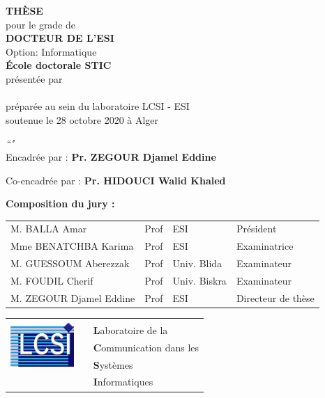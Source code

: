 \begin{center}
	
	{\Large \bfseries TH\`ESE}\\
	pour le grade de\\
	{\Large \bfseries DOCTEUR DE L'ESI}\\
	Option: Informatique\\
	{\bfseries École doctorale STIC}\\
	présentée par\\
	{\LARGE \bfseries \@author}\\[0.5cm]
	préparée au sein du laboratoire LCSI - ESI \\
	soutenue le 28 octobre 2020 à Alger\\[1cm]
	
	
	{\Huge \bfseries \@title}

	{\LARGE \slshape ``\@subtitle"}\\[1cm]
	
	Encadrée par : \textbf{Pr. ZEGOUR Djamel Eddine}
	
	Co-encadrée par : \textbf{Pr. HIDOUCI Walid Khaled}
\end{center}
\makeatother %


\vfill

\noindent
\textbf{Composition du jury :}

\noindent
\begin{tabular}{p{}p{}p{}p{}}
	M. BALLA Amar & Prof & ESI & Président \\
	Mme BENATCHBA Karima & Prof & ESI & Examinatrice \\
	M. GUESSOUM Aberezzak & Prof & Univ. Blida & Examinateur\\
	M. FOUDIL Cherif & Prof & Univ. Biskra & Examinateur \\
	M. ZEGOUR Djamel Eddine & Prof & ESI & Directeur de thèse \\            
	
\end{tabular}

\vfill                  

\noindent\hrulefill\vskip 2pt

{ \renewcommand{\arraystretch}{0.6}
\noindent
\begin{tabular}{lll}
	\multirow{4}{*}{\includegraphics[width=2.4cm,align=t]{figures/logo/K-LCSI.png}} &&\\
	&& \textbf{L}aboratoire de la \\
	&& \textbf{C}ommunication dans les \\
	&& \textbf{S}ystèmes \\
	&& \textbf{I}nformatiques \\
\end{tabular}
}




\restoregeometry
\cleardoublepage
